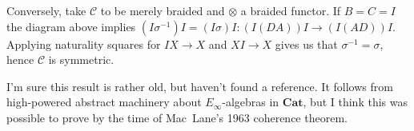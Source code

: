 \documentclass{amsart}
\begin{document}
\medskip
\noindent Conversely, take $\mathcal{C}$ to be merely braided and $\otimes$ a braided functor. If $B=C=I$ the diagram above implies $(I\sigma^{-1})I = (I\sigma)I\colon (I(DA))I \to (I(AD))I$. Applying naturality squares for $IX\to X$ and $XI\to X$ gives us that $\sigma^{-1}=\sigma$, hence $\mathcal{C}$ is symmetric.
\medskip

\noindent
I'm sure this result is rather old, but haven't found a reference. It follows from high-powered abstract machinery about $E_\infty$-algebras in $\mathbf{Cat}$, but I think this was possible to prove by the time of Mac~Lane's 1963 coherence theorem.
\end{document}
